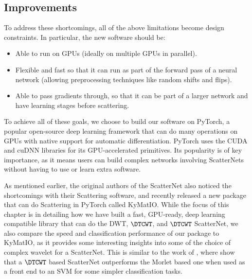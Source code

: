 \subsection{Improvements}
To address these shortcomings, all of the above limitations become design
constraints. In particular, the new software should be:
\begin{itemize}
  \item Able to run on GPUs (ideally on multiple GPUs in parallel).
  \item Flexible and fast so that it can run as part of the forward pass of
    a neural network (allowing preprocessing techniques like random shifts and
    flips).
  \item Able to pass gradients through, so that it can be part of a larger
    network and have learning stages before scattering.
\end{itemize}

To achieve all of these goals, we choose to build our software on PyTorch,
a popular open-source deep learning framework that can do many operations on
GPUs with native support for automatic differentiation. PyTorch uses the CUDA
and cuDNN libraries for its GPU-accelerated primitives. Its popularity
is of key importance, as it means users can build complex networks involving
ScatterNets without having to use or learn extra software.

As mentioned earlier, the original authors of the ScatterNet also noticed the
shortcomings with their Scattering software, and recently released a new package
that can do Scattering in PyTorch called KyMatIO\cite{andreux_kymatio:_2018}.
While the focus of this chapter is in detailing how we have
built a fast, GPU-ready, deep learning compatible library that can do the
DWT, $\DTCWT$, and $\DTCWT$ ScatterNet, we also compare the speed and
classification performance of our package to KyMatIO, as it provides some
interesting insights into some of the choice of complex wavelet
for a ScatterNet. This is similar to the work of
\cite{singh_multi-resolution_2016}, where
\citeauthor{singh_multi-resolution_2016} show that a $\DTCWT$
based ScatterNet outperforms the Morlet based one when used as a front end to an
SVM for some simpler classification tasks.
